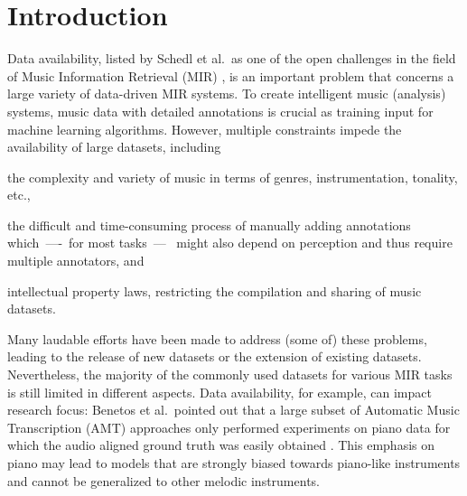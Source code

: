 \documentclass{article}
\begin{document}
\section{Introduction}
Data availability, listed by Schedl et al.\ as one of the open challenges in the field of Music Information Retrieval (MIR) \cite{Schedl2014}, is an important problem that concerns a large variety of data-driven MIR systems. To create intelligent music (analysis) systems, music data with detailed annotations is crucial as training input for machine learning algorithms. %
However, multiple constraints impede the availability of large datasets, including %
\begin{inparaenum}[(i)]
    \item   the complexity and variety of music in terms of genres, instrumentation, tonality, etc., 
    \item   the difficult and time-consuming process of manually adding annotations which~----~for most tasks~---~ might also depend on perception and thus require multiple annotators, and 
    \item   intellectual property laws, restricting the compilation and sharing of music datasets.
\end{inparaenum}
Many laudable efforts have been made to address (some of) these problems, leading to the release of new datasets or the extension of existing datasets. %
Nevertheless, the majority of the commonly used datasets for various MIR tasks is still limited in different aspects. Data availability, for example, can impact research focus: %
Benetos et al.\ pointed out that a large subset of Automatic Music Transcription (AMT) approaches only performed experiments on piano data for which the audio aligned ground truth was easily obtained \cite{Benetos2013}. This emphasis on piano may lead to models that are strongly biased towards piano-like instruments and cannot be generalized to other melodic instruments. 
\end{document}
